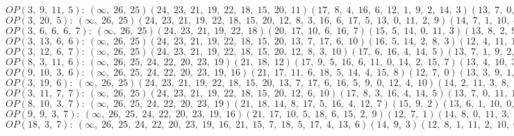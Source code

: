 $OP(3, \;9, \;11, \;5): \:(\infty, \;26, \;25)(24, \;23, \;21, \;19, \;22, \;18, \;15, \;20, \;11)(17, \;8, \;4, \;16, \;6, \;12, \;1, \;9, \;2, \;14, \;3)(13, \;7, \;0, \;10, \;5)$\\
$OP(3, \;20, \;5): \:(\infty, \;26, \;25)(24, \;23, \;21, \;19, \;22, \;18, \;15, \;20, \;12, \;8, \;3, \;16, \;6, \;17, \;5, \;13, \;0, \;11, \;2, \;9)(14, \;7, \;1, \;10, \;4)$\\
$OP(3, \;6, \;6, \;6, \;7): \:(\infty, \;26, \;25)(24, \;23, \;21, \;19, \;22, \;18)(20, \;17, \;10, \;6, \;16, \;7)(15, \;5, \;14, \;0, \;11, \;3)(13, \;8, \;2, \;9, \;4, \;12, \;1)$\\
$OP(3, \;13, \;6, \;6): \:(\infty, \;26, \;25)(24, \;23, \;21, \;19, \;22, \;18, \;15, \;20, \;13, \;7, \;17, \;6, \;10)(16, \;5, \;14, \;2, \;8, \;3)(12, \;4, \;11, \;1, \;9, \;0)$\\
$OP(3, \;12, \;6, \;7): \:(\infty, \;26, \;25)(24, \;23, \;21, \;19, \;22, \;18, \;15, \;20, \;12, \;8, \;3, \;10)(17, \;6, \;16, \;4, \;14, \;5)(13, \;7, \;1, \;9, \;2, \;11, \;0)$\\
$OP(8, \;3, \;11, \;6): \:(\infty, \;26, \;25, \;24, \;22, \;20, \;23, \;19)(21, \;18, \;12)(17, \;9, \;5, \;16, \;6, \;11, \;0, \;14, \;2, \;15, \;7)(13, \;4, \;10, \;3, \;8, \;1)$\\
$OP(9, \;10, \;3, \;6): \:(\infty, \;26, \;25, \;24, \;22, \;20, \;23, \;19, \;16)(21, \;17, \;11, \;6, \;18, \;5, \;14, \;4, \;15, \;8)(12, \;7, \;0)(13, \;3, \;9, \;1, \;10, \;2)$\\
$OP(3, \;19, \;6): \:(\infty, \;26, \;25)(24, \;23, \;21, \;19, \;22, \;18, \;15, \;20, \;13, \;7, \;17, \;6, \;16, \;5, \;9, \;0, \;12, \;4, \;10)(14, \;2, \;11, \;3, \;8, \;1)$\\
$OP(3, \;11, \;7, \;7): \:(\infty, \;26, \;25)(24, \;23, \;21, \;19, \;22, \;18, \;15, \;20, \;12, \;6, \;10)(17, \;8, \;3, \;16, \;4, \;14, \;5)(13, \;7, \;0, \;11, \;1, \;9, \;2)$\\
$OP(8, \;10, \;3, \;7): \:(\infty, \;26, \;25, \;24, \;22, \;20, \;23, \;19)(21, \;18, \;14, \;8, \;17, \;5, \;16, \;4, \;12, \;7)(15, \;9, \;2)(13, \;6, \;1, \;10, \;0, \;11, \;3)$\\
$OP(9, \;9, \;3, \;7): \:(\infty, \;26, \;25, \;24, \;22, \;20, \;23, \;19, \;16)(21, \;17, \;10, \;5, \;18, \;6, \;15, \;2, \;9)(12, \;7, \;1)(14, \;8, \;0, \;11, \;3, \;13, \;4)$\\
$OP(18, \;3, \;7): \:(\infty, \;26, \;25, \;24, \;22, \;20, \;23, \;19, \;16, \;21, \;15, \;7, \;18, \;5, \;17, \;4, \;13, \;6)(14, \;9, \;3)(12, \;8, \;1, \;11, \;2, \;10, \;0)$\\
